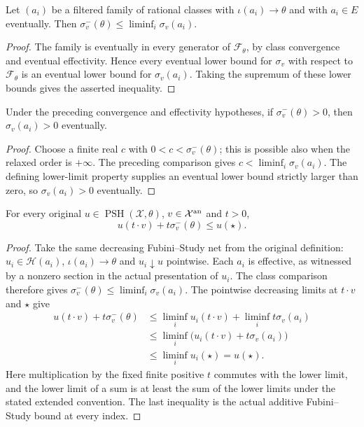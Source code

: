 \begin{lemma}
\label{lem:fp-relaxed-liminf-net}
\leanok
{}
Let $(a_i)$ be a filtered family of rational classes with
$\iota(a_i)\to\theta$ and with $a_i\in E$ eventually.  Then
$\sigma^-_v(\theta)\le\liminf_i\sigma_v(a_i)$.
\end{lemma}
\begin{proof}
The family is eventually in every generator of $\mathcal F_\theta$,
by class convergence and eventual effectivity.  Hence every eventual
lower bound for $\sigma_v$ with respect to $\mathcal F_\theta$ is an
eventual lower bound for $\sigma_v(a_i)$.  Taking the supremum of
these lower bounds gives the asserted inequality.
\end{proof}

\begin{lemma}
\label{lem:fp-eventually-positive-orders}
\leanok
{}
Under the preceding convergence and effectivity hypotheses, if
$\sigma^-_v(\theta)>0$, then $\sigma_v(a_i)>0$ eventually.
\end{lemma}
\begin{proof}
Choose a finite real $c$ with $0<c<\sigma^-_v(\theta)$; this is
possible also when the relaxed order is $+\infty$.  The preceding
comparison gives $c<\liminf_i\sigma_v(a_i)$.  The defining lower-limit
property supplies an eventual lower bound strictly larger than zero,
so $\sigma_v(a_i)>0$ eventually.
\end{proof}

\begin{theorem}
\label{thm:fp-psh-additive-ray}
\leanok
{}
For every original $u\in\operatorname{PSH}(\mathcal X,\theta)$,
$v\in\mathcal X^{\mathrm{an}}$ and $t>0$,
\[
 u(t\cdot v)+t\sigma^-_v(\theta)\le u(\star).
\]
\end{theorem}
\begin{proof}
Take the same decreasing Fubini--Study net from the original definition:
$u_i\in\mathcal H(a_i)$, $\iota(a_i)\to\theta$ and $u_i\downarrow u$
pointwise.  Each $a_i$ is effective, as witnessed by a nonzero section
in the actual presentation of $u_i$.  The class comparison therefore
gives $\sigma^-_v(\theta)\le\liminf_i\sigma_v(a_i)$.
The pointwise decreasing limits at $t\cdot v$ and $\star$ give
\[
\begin{split}
 u(t\cdot v)+t\sigma^-_v(\theta)
 &\le \liminf_i u_i(t\cdot v)+\liminf_i t\sigma_v(a_i)\\
 &\le \liminf_i\bigl(u_i(t\cdot v)+t\sigma_v(a_i)\bigr)\\
 &\le \liminf_i u_i(\star)=u(\star).
\end{split}
\]
Here multiplication by the fixed finite positive $t$ commutes with
the lower limit, and the lower limit of a sum is at least the sum
of the lower limits under the stated extended convention.  The last
inequality is the actual additive Fubini--Study bound at every index.
\end{proof}

